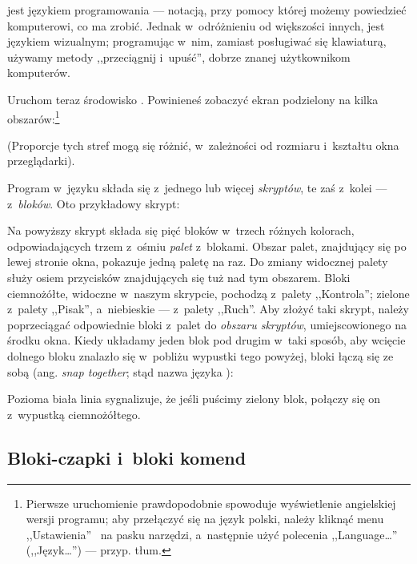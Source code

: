 \documentclass[a4paper]{report}
\begin{document}
\Snap{} jest językiem programowania --- notacją, przy pomocy której możemy powiedzieć komputerowi, co ma zrobić. Jednak w~odróżnieniu od większości innych, \Snap{} jest językiem wizualnym; programując w~nim, zamiast posługiwać się klawiaturą, używamy metody ,,przeciągnij i~upuść'', dobrze znanej użytkownikom komputerów.

Uruchom teraz środowisko \Snap{}. Powinieneś zobaczyć ekran podzielony na kilka obszarów:\footnote{\onehalfspacing Pierwsze uruchomienie  prawdopodobnie spowoduje wyświetlenie angielskiej wersji programu; aby przełączyć się na język polski, należy kliknąć menu ,,Ustawienia''~ na pasku narzędzi, a~następnie użyć polecenia ,,Language\ldots'' (,,Język\ldots'') --- przyp. tłum.}\nopagebreak

\begin{center}
\def\svgwidth{\textwidth}

\end{center}

(Proporcje tych stref mogą się różnić, w~zależności od rozmiaru i~kształtu okna przeglądarki).

Program w~języku \Snap{} składa się z~jednego lub więcej \emph{skryptów}, te zaś z~kolei --- z~\emph{bloków}. Oto przykładowy skrypt:\nopagebreak

\label{fig:typowy-skrypt}

Na powyższy skrypt składa się pięć bloków w~trzech różnych kolorach, odpowiadających trzem z~ośmiu \emph{palet} z~blokami. Obszar palet, znajdujący się po lewej stronie okna, pokazuje jedną paletę na raz. Do zmiany widocznej palety służy osiem przycisków znajdujących się tuż nad tym obszarem. Bloki ciemnożółte, widoczne w~naszym skrypcie, pochodzą z~palety ,,Kontrola''; zielone z~palety ,,Pisak'', a~niebieskie --- z~palety ,,Ruch''. Aby złożyć taki skrypt, należy poprzeciągać odpowiednie bloki z~palet do \emph{obszaru skryptów}, umiejscowionego na środku okna. Kiedy układamy jeden blok pod drugim w~taki sposób, aby wcięcie dolnego bloku znalazło się w~pobliżu wypustki tego powyżej, bloki łączą się ze sobą (ang. \textit{snap together}; stąd nazwa języka \Snap{}):\nopagebreak


Pozioma biała linia sygnalizuje, że jeśli puścimy zielony blok, połączy się on z~wypustką ciemnożółtego.

\subsection{Bloki-czapki i~bloki komend}
\end{document}
